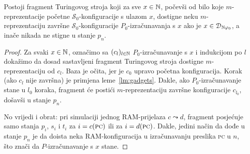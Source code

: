 \begin{propozicija}[{name=[treći fragment transpiliranog stroja]}]\label{pp:faza3}
	Postoji fragment Turingovog stroja koji za sve $x\in{\mathbb N}$, počevši od bilo koje $m$-reprezentacije početne $\mathcal S_0$-konfiguracije s ulazom $x$, dostigne neku $m$-reprezentaciju završne $\mathcal S_0$-konfiguracije $P_0$-izračunavanja s $x$ ako je $x\in\mathcal D_{{\mathbb N}\varphi_0}$, a inače nikada ne stigne u stanje $p_n$.
\end{propozicija}
\begin{proof}
	Za svaki $x\in{\mathbb N}$, označimo sa $(c_l)_{l\in{\mathbb N}}$ $P_0$-izračunavanje s $x$ i indukcijom po $l$ dokažimo da dosad sastavljeni fragment Turingovog stroja dostigne $m$-reprezentaciju od $c_l$. Baza je očita, jer je $c_0$ upravo početna konfiguracija. %
	Korak (ako $c_l$ nije završna) je primjena leme~\ref{lm:gadgets}. Dakle, ako $P_0$-izračunavanje stane u $l_0$ koraka, fragment će postići $m$-reprezentaciju završne konfiguracije $c_{l_0}$, došavši u stanje $p_n$.

No vrijedi i obrat: pri simulaciji jednog RAM-prijelaza $c\leadsto d$, fragment posjećuje samo stanja $p_i$, $s_i$ i $t_i$ za $i=c(\textsc{pc})$ ili za $i=d(\textsc{pc})$. Dakle, jedini način da dođe u stanje $p_n$ je da doista neka RAM-konfiguracija u izračunavanju preslika \textsc{pc} u $n$, što znači da $P$-izračunavanje s $x$ stane.
\end{proof}




